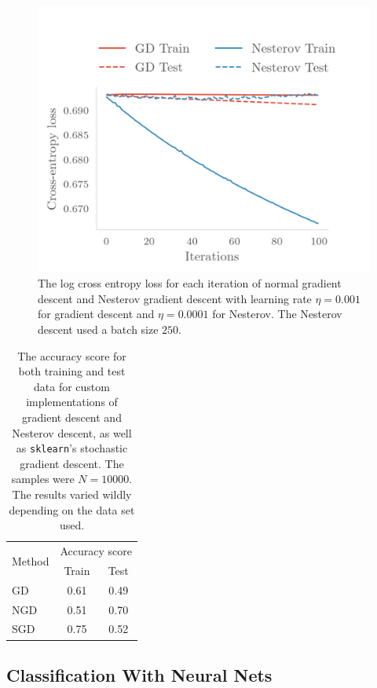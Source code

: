 \begin{figure}[H]
  \centering
  \includegraphics[]{figures/GD_loss.png}
  \caption{\label{fig:GD_loss} The log cross entropy loss for each iteration
    of normal gradient descent and Nesterov gradient descent with learning rate
    \(\eta = 0.001\) for gradient descent and \(\eta = 0.0001\) for Nesterov.
    The Nesterov descent used a batch size \(250\).}
\end{figure}

\begin{table}
  \centering
  \begin{tabular}{l|c|c}
    \multirow{2}{*}{Method} & \multicolumn{2}{c}{Accuracy score}\\
    & Train & Test \\
    \hline
    GD & 0.61 & 0.49 \\
    NGD & 0.51 & 0.70 \\
    SGD & 0.75 & 0.52\\
  \end{tabular}
  \caption{The accuracy score for both training and test data for custom
    implementations of gradient descent and Nesterov descent, as well as
    \texttt{sklearn}'s stochastic gradient descent. The samples were $N=10000$.
    The results varied wildly depending on the data set used.}
  \label{tab:1}
\end{table}


\subsection{Classification With Neural Nets}

